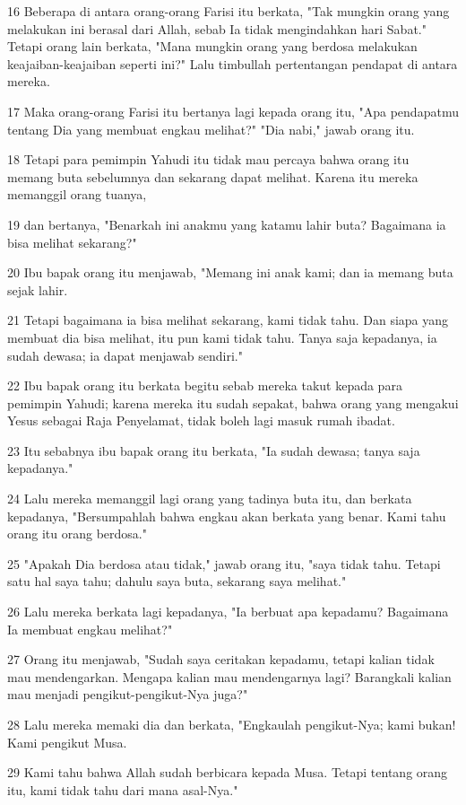 \par 16 Beberapa di antara orang-orang Farisi itu berkata, "Tak mungkin orang yang melakukan ini berasal dari Allah, sebab Ia tidak mengindahkan hari Sabat." Tetapi orang lain berkata, "Mana mungkin orang yang berdosa melakukan keajaiban-keajaiban seperti ini?" Lalu timbullah pertentangan pendapat di antara mereka.
\par 17 Maka orang-orang Farisi itu bertanya lagi kepada orang itu, "Apa pendapatmu tentang Dia yang membuat engkau melihat?" "Dia nabi," jawab orang itu.
\par 18 Tetapi para pemimpin Yahudi itu tidak mau percaya bahwa orang itu memang buta sebelumnya dan sekarang dapat melihat. Karena itu mereka memanggil orang tuanya,
\par 19 dan bertanya, "Benarkah ini anakmu yang katamu lahir buta? Bagaimana ia bisa melihat sekarang?"
\par 20 Ibu bapak orang itu menjawab, "Memang ini anak kami; dan ia memang buta sejak lahir.
\par 21 Tetapi bagaimana ia bisa melihat sekarang, kami tidak tahu. Dan siapa yang membuat dia bisa melihat, itu pun kami tidak tahu. Tanya saja kepadanya, ia sudah dewasa; ia dapat menjawab sendiri."
\par 22 Ibu bapak orang itu berkata begitu sebab mereka takut kepada para pemimpin Yahudi; karena mereka itu sudah sepakat, bahwa orang yang mengakui Yesus sebagai Raja Penyelamat, tidak boleh lagi masuk rumah ibadat.
\par 23 Itu sebabnya ibu bapak orang itu berkata, "Ia sudah dewasa; tanya saja kepadanya."
\par 24 Lalu mereka memanggil lagi orang yang tadinya buta itu, dan berkata kepadanya, "Bersumpahlah bahwa engkau akan berkata yang benar. Kami tahu orang itu orang berdosa."
\par 25 "Apakah Dia berdosa atau tidak," jawab orang itu, "saya tidak tahu. Tetapi satu hal saya tahu; dahulu saya buta, sekarang saya melihat."
\par 26 Lalu mereka berkata lagi kepadanya, "Ia berbuat apa kepadamu? Bagaimana Ia membuat engkau melihat?"
\par 27 Orang itu menjawab, "Sudah saya ceritakan kepadamu, tetapi kalian tidak mau mendengarkan. Mengapa kalian mau mendengarnya lagi? Barangkali kalian mau menjadi pengikut-pengikut-Nya juga?"
\par 28 Lalu mereka memaki dia dan berkata, "Engkaulah pengikut-Nya; kami bukan! Kami pengikut Musa.
\par 29 Kami tahu bahwa Allah sudah berbicara kepada Musa. Tetapi tentang orang itu, kami tidak tahu dari mana asal-Nya."
